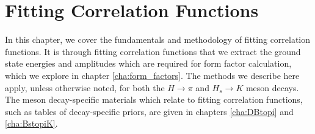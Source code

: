 \chapter{Fitting Correlation Functions}\label{cha:fitting_correlation_functions}
In this chapter, we cover the fundamentals and methodology of fitting correlation functions.  It is through fitting correlation functions that we extract the ground state energies and amplitudes which are required for form factor calculation, which we explore in chapter \ref{cha:form_factors}.  The methods we describe here apply, unless otherwise noted, for both the $H\rightarrow\pi$ and $H_s\rightarrow K$ meson decays.  The meson decay-specific materials which relate to fitting correlation functions, such as tables of decay-specific priors, are given in chapters \ref{cha:DBtopi} and \ref{cha:BstopiK}.

